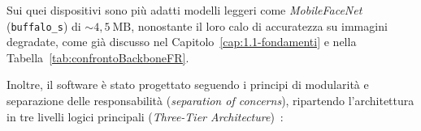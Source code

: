 Sui quei dispositivi sono più adatti modelli leggeri come \textit{MobileFaceNet} (\texttt{buffalo\_s}) di $\sim 4{,}5~\text{MB}$, nonostante il loro calo di accuratezza su immagini degradate, come già discusso nel Capitolo~\ref{cap:1.1-fondamenti} e nella Tabella~\ref{tab:confrontoBackboneFR}.

Inoltre, il software è stato progettato seguendo i principi di modularità e separazione delle responsabilità (\textit{separation of concerns}), ripartendo l'architettura in tre livelli logici principali (\textit{Three-Tier Architecture})~\cite{sawetsutipunFacialImageVerification2020a}:
